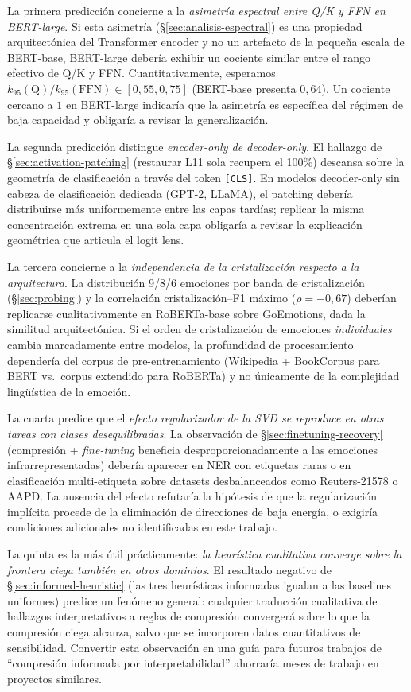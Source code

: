 La primera predicción concierne a la \emph{asimetría espectral entre
Q/K y FFN en BERT-large}. Si esta asimetría
(\S\ref{sec:analisis-espectral}) es una propiedad arquitectónica del
Transformer encoder y no un artefacto de la pequeña escala de
BERT-base, BERT-large debería exhibir un cociente similar entre el
rango efectivo de Q/K y FFN. Cuantitativamente, esperamos
$k_{95}(\text{Q})/k_{95}(\text{FFN}) \in [0{,}55, 0{,}75]$
(BERT-base presenta $0{,}64$). Un cociente cercano a $1$ en BERT-large
indicaría que la asimetría es específica del régimen de baja capacidad
y obligaría a revisar la generalización.

La segunda predicción distingue \emph{encoder-only de decoder-only}.
El hallazgo de \S\ref{sec:activation-patching} (restaurar L11 sola
recupera el 100\%) descansa sobre la geometría de clasificación a
través del token \texttt{[CLS]}. En modelos decoder-only sin cabeza de
clasificación dedicada (GPT-2, LLaMA), el patching debería distribuirse
más uniformemente entre las capas tardías; replicar la misma
concentración extrema en una sola capa obligaría a revisar la
explicación geométrica que articula el logit lens.

La tercera concierne a la \emph{independencia de la cristalización
respecto a la arquitectura}. La distribución 9/8/6 emociones por banda
de cristalización (\S\ref{sec:probing}) y la correlación
cristalización--F1 máximo ($\rho = -0{,}67$) deberían replicarse
cualitativamente en RoBERTa-base sobre GoEmotions, dada la similitud
arquitectónica. Si el orden de cristalización de emociones
\emph{individuales} cambia marcadamente entre modelos, la profundidad
de procesamiento dependería del corpus de pre-entrenamiento
(Wikipedia + BookCorpus para BERT vs.\ corpus extendido para RoBERTa)
y no únicamente de la complejidad lingüística de la emoción.

La cuarta predice que el \emph{efecto regularizador de la SVD se
reproduce en otras tareas con clases desequilibradas}. La observación
de \S\ref{sec:finetuning-recovery} (compresión + \emph{fine-tuning}
beneficia desproporcionadamente a las emociones infrarrepresentadas)
debería aparecer en NER con etiquetas raras o en clasificación
multi-etiqueta sobre datasets desbalanceados como Reuters-21578 o
AAPD. La ausencia del efecto refutaría la hipótesis de que la
regularización implícita procede de la eliminación de direcciones de
baja energía, o exigiría condiciones adicionales no identificadas en
este trabajo.

La quinta es la más útil prácticamente: \emph{la heurística
cualitativa converge sobre la frontera ciega también en otros
dominios}. El resultado negativo de \S\ref{sec:informed-heuristic}
(las tres heurísticas informadas igualan a las baselines uniformes)
predice un fenómeno general: cualquier traducción cualitativa de
hallazgos interpretativos a reglas de compresión convergerá sobre lo
que la compresión ciega alcanza, salvo que se incorporen datos
cuantitativos de sensibilidad. Convertir esta observación en una guía
para futuros trabajos de ``compresión informada por interpretabilidad''
ahorraría meses de trabajo en proyectos similares.

